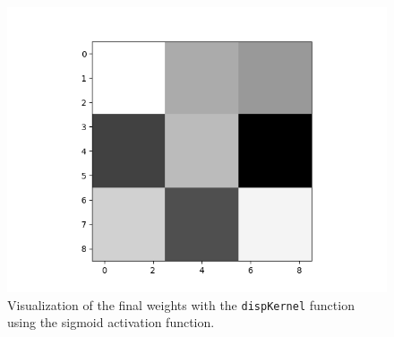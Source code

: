 \documentclass{article}
\begin{document}
\begin{enumerate}
\begin{enumerate}
\begin{figure}[ht]
\begin{center}
                  \end{center}
                \end{figure}
                \begin{figure}[ht]
                  \begin{center}
                    \includegraphics[width=0.7\linewidth]{figures/sigmoid-dispkernel.png}
                    \caption{Visualization of the final weights with the \texttt{dispKernel}
                      function using the sigmoid activation function.}
                    \label{fig:sigmoid-dispkernel}
                  \end{center}
                \end{figure}
        \end{enumerate}
\end{enumerate}
\end{document}
